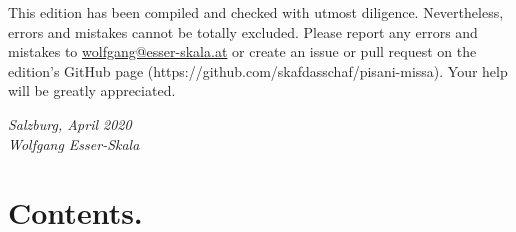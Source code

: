 \documentclass[parskip=full]{scrreprt}
\newif\iftemplate\templatetrue
\begin{document}
This edition has been compiled and checked with utmost diligence. Nevertheless, errors and mistakes cannot be totally excluded. Please report any errors and mistakes to \url{wolfgang@esser-skala.at} or create an issue or pull request on the edition’s GitHub page (https://github.com/skafdasschaf/pisani-missa). Your help will be greatly appreciated.

\bigskip
\textit{Salzburg, April 2020\\
Wolfgang Esser-Skala}


\chapter*{Contents.}



\cleardoublepage
\fi

\iftemplate

\fi
\end{document}
